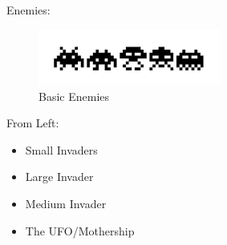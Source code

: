 \documentclass[15pt]{beamer}
\begin{document}
\begin{frame}
Enemies:
	\begin{figure}[ht!]
	\centering
	\includegraphics[width=60mm]{basic_enemies_2.png}
	\caption{Basic Enemies}
	\end{figure}
From Left:
	\begin{itemize}
    \item Small Invaders
		\item Large Invader
		\item Medium Invader
		\item The UFO/Mothership
	\end{itemize}
\end{frame}
\end{document}
